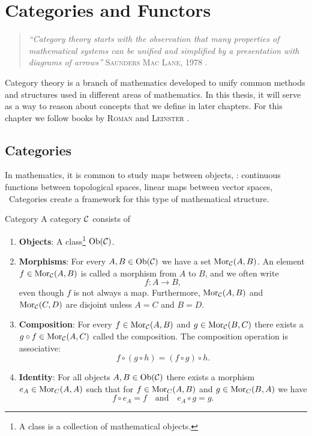 \chapter{Categories and Functors}
\label{chapter__category_theory}

\begin{quote}
\textit{``Category theory starts with the observation that many properties of mathematical systems can be unified and simplified by a presentation with diagrams of arrows''} \hfill \textsc{Saunders Mac Lane}, 1978 \cite[p.~1]{MacLane1978}. \hspace*{5mm}
\end{quote}

Category theory is a branch of mathematics developed to unify common methods and structures used in different areas of mathematics. 
In this thesis, it will serve as a way to reason about concepts that we define in later chapters. For this chapter we follow books by \textsc{Roman} \cite{Roman2017} and \textsc{Leinster} \cite{Leinster2014-dc}.

\section{Categories}

In mathematics, it is common to study maps between objects, \eg: continuous functions between topological spaces, linear maps between vector spaces, \etc\
Categories create a framework for this type of mathematical structure.

\begin{definition}{Category \cite[Sec.~1.2]{Roman2017}}{}
A category $\mathcal{C}$ consists of
\begin{enumerate}
    \item \textbf{Objects}: A class\footnote{A class is a collection of mathematical objects.} $\mathrm {Ob}(\mathcal{C})$.
    
    \item \textbf{Morphisms}: For every $A, B \in \mathrm {Ob}(\mathcal{C})$ we have a set $\mathrm {Mor}_{\mathcal{C}}(A,B)$. An element $f \in \mathrm {Mor}_{\mathcal{C}}(A,B)$ is called a morphism from $A$ to $B$, and we often write 
    $$
    f\colon A \to B,
    $$
    even though $f$ is not always a map. Furthermore, $\mathrm {Mor}_{\mathcal{C}}(A,B)$ and $\mathrm {Mor}_{\mathcal{C}}(C,D)$ are disjoint unless $A = C$ and $B = D$.
    
    \item \textbf{Composition}: For every $f \in \mathrm {Mor}_{\mathcal{C}}(A,B)$ and $g \in \mathrm {Mor}_{\mathcal{C}}(B,C)$ there exists a $g \circ f \in \mathrm {Mor}_{\mathcal{C}}(A,C)$ called the composition. The composition operation is associative: 
    $$
    f \circ (g \circ h) = (f \circ g) \circ h.
    $$

    \item \textbf{Identity}: For all objects $A,B \in \mathrm {Ob}(\mathcal{C})$ there exists a morphism ${e_A \in \mathrm {Mor}_C(A,A)}$ such that for $f \in \mathrm {Mor}_C(A,B)$ and $g \in \mathrm {Mor}_C(B,A)$ we have
    $$
    f \circ e_A = f \quad \text{and} \quad e_A \circ g = g.
    $$
\end{enumerate}
\end{definition}

